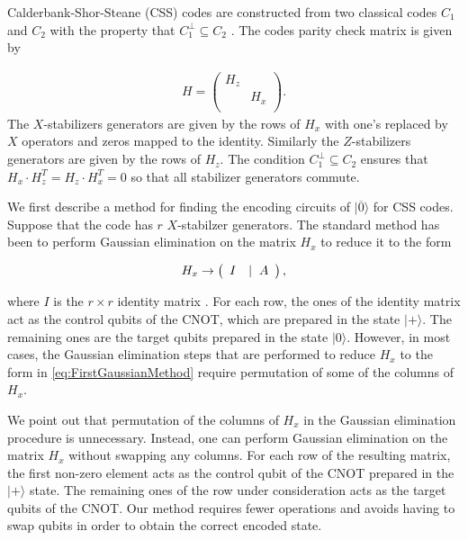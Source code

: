 \documentclass[pra,longbibliography,twocolumn,showpacs,nofootinbib,superscriptaddress,notitlepage]{revtex4-1}
\begin{document}
Calderbank-Shor-Steane (CSS) codes are constructed from two classical codes $C_{1}$ and $C_{2}$ with the property that $C_{1}^{\perp} \subseteq C_{2}$ \cite{SteaneCSS}. The codes parity check matrix is given by 

\begin{align}
H = \left( \begin{array}{cc}
                                          H_{z} &  \\
                                           &H_{x}\\                                                                     
                                          \end{array} \right).
\label{eq:ParityCheck}
\end{align}
The $X$-stabilizers generators are given by the rows of $H_{x}$ with one's replaced by $X$ operators and zeros mapped to the identity. Similarly the $Z$-stabilizers generators are given by the rows of $H_{z}$. The condition  $C_{1}^{\perp} \subseteq C_{2}$ ensures that $H_{x} \cdot H_{z}^{T} = H_{z} \cdot H_{x}^{T} = 0$ so that all stabilizer generators commute. 

We first describe a method for finding the encoding circuits of $|\overline{0} \rangle$ for CSS codes. Suppose that the code has $r$ $X$-stabilzer generators. The standard method has been to perform Gaussian elimination on the matrix $H_{x}$ to reduce it to the form

\begin{align}
H_{x} \to \left( \begin{array}{cc}
                                          I&| \hspace{0.2cm} A                                                                                           
                                          \end{array} \right),
\label{eq:FirstGaussianMethod}
\end{align} 

where $I$ is the $r \times r$ identity matrix \cite{CDT09, PR12, Steane02}. For each row, the ones of the identity matrix act as the control qubits of the CNOT, which are prepared in the state $| + \rangle$. The remaining ones are the target qubits prepared in the state $|0 \rangle$. However, in most cases, the Gaussian elimination steps that are performed to reduce $H_{x}$ to the form in \cref{eq:FirstGaussianMethod} require permutation of some of the columns of $H_{x}$. 

We point out that permutation of the columns of $H_{x}$ in the Gaussian elimination procedure is unnecessary. Instead, one can perform Gaussian elimination on the matrix $H_{x}$ without swapping any columns. For each row of the resulting matrix, the first non-zero element acts as the control qubit of the CNOT prepared in the $| + \rangle$ state. The remaining ones of the row under consideration acts as the target qubits of the CNOT. Our method requires fewer operations and avoids having to swap qubits in order to obtain the correct encoded state.
\end{document}
